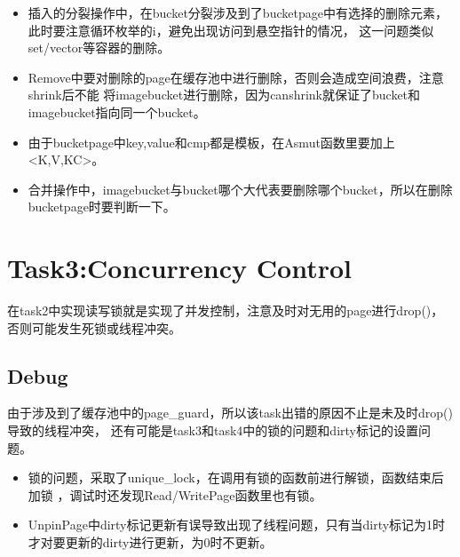 \documentclass[a4paper]{article}
\begin{document}
\begin{itemize}
   \item 插入的分裂操作中，在bucket分裂涉及到了bucketpage中有选择的删除元素，此时要注意循环枚举的i，避免出现访问到悬空指针的情况，
   这一问题类似set/vector等容器的删除。
   \item Remove中要对删除的page在缓存池中进行删除，否则会造成空间浪费，注意shrink后不能
   将imagebucket进行删除，因为canshrink就保证了bucket和imagebucket指向同一个bucket。
   \item 由于bucketpage中key,value和cmp都是模板，在Asmut函数里要加上<K,V,KC>。
   \item 合并操作中，imagebucket与bucket哪个大代表要删除哪个bucket，所以在删除bucketpage时要判断一下。
\end{itemize}

\section{Task3:Concurrency Control}

在task2中实现读写锁就是实现了并发控制，注意及时对无用的page进行drop()，否则可能发生死锁或线程冲突。

\subsection{Debug}

由于涉及到了缓存池中的page\_guard，所以该task出错的原因不止是未及时drop()导致的线程冲突，
还有可能是task3和task4中的锁的问题和dirty标记的设置问题。

\begin{itemize}
   \item 锁的问题，采取了unique\_lock，在调用有锁的函数前进行解锁，函数结束后加锁
   ，调试时还发现Read/WritePage函数里也有锁。
   \item UnpinPage中dirty标记更新有误导致出现了线程问题，只有当dirty标记为1时才对要更新的dirty进行更新，为0时不更新。
\end{itemize}


\newpage

 
\end{document}
